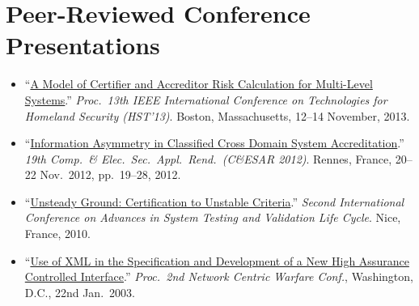 \section*{Peer-Reviewed Conference Presentations}
\vspace{-2mm}

\begin{itemize}
	\item ``\href{http://ieeexplore.ieee.org/xpls/abs_all.jsp?arnumber=6699004}%
{A Model of Certifier and Accreditor Risk Calculation for Multi-Level
Systems}.'' \emph{Proc.\ 13th IEEE International Conference on Technologies
for Homeland Security (HST'13)}. Boston, Massachusetts, 12--14 November,
2013.\vspace{-1mm}

	\item
``\href{http://call-with-current-continuation.com/papers/CESAR2012_information_asymmetry.pdf}%
{Information Asymmetry in Classified Cross Domain System Accreditation}.''
\emph{19th Comp.\ \& Elec.\ Sec.\ Appl.\ Rend.\ (C\&ESAR 2012)}. Rennes,
France, 20--22 Nov.\ 2012, pp.\ 19--28, 2012.\vspace{-1mm}

	\item
``\href{http://ieeexplore.ieee.org/xpl/articleDetails.jsp?arnumber=5617171}%
{Unsteady Ground: Certification to Unstable Criteria}.'' \emph{Second
International Conference on Advances in System Testing and Validation Life
Cycle}. Nice, France, 2010.\vspace{-1mm}


	\item ``\href{http://call-with-current-continuation.com/papers/xml_paper.pdf}%
{Use of XML in the Specification and Development of a New High Assurance
Controlled Interface}.'' \emph{Proc.\ 2nd Network Centric Warfare Conf.},
Washington, D.C., 22nd Jan.\ 2003.
\end{itemize}

